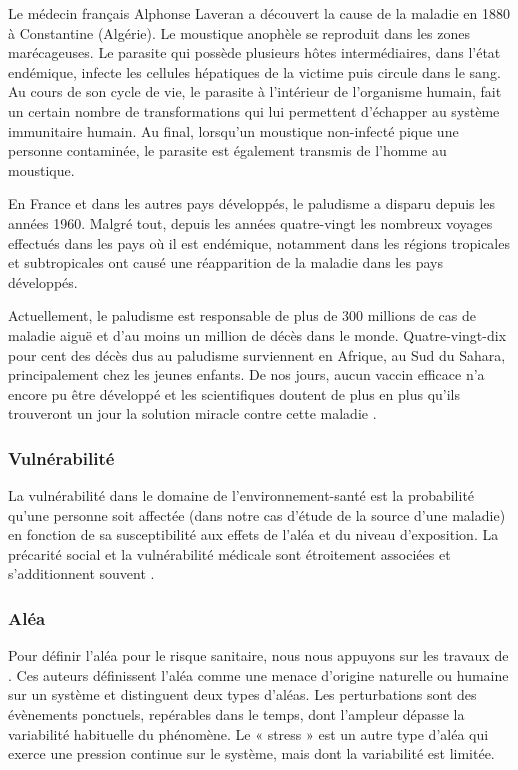 Le médecin français Alphonse Laveran a découvert la cause de la maladie en 1880 à Constantine (Algérie). Le moustique anophèle se reproduit dans les zones marécageuses. Le parasite qui possède plusieurs hôtes intermédiaires, dans l'état endémique, infecte les cellules hépatiques de la victime puis circule dans le sang. Au cours de son cycle de vie, le parasite à l'intérieur de l'organisme humain, fait un certain nombre de transformations qui lui permettent d'échapper au système immunitaire humain. Au final, lorsqu'un moustique non-infecté pique une personne contaminée, le parasite est également transmis de l'homme au moustique.

En France et dans les autres pays développés, le paludisme a disparu depuis les années 1960. Malgré tout, depuis les années quatre-vingt les nombreux voyages effectués dans les pays où il est endémique, notamment dans les régions tropicales et subtropicales ont causé une réapparition de la maladie dans les pays développés.  

Actuellement, le paludisme est responsable de plus de 300 millions de cas de maladie aiguë et d'au moins un million de décès dans le monde. Quatre-vingt-dix pour cent des décès dus au paludisme surviennent en Afrique, au Sud du Sahara, principalement chez les jeunes enfants. De nos jours, aucun vaccin efficace n'a encore pu être développé et les scientifiques doutent de plus en plus qu'ils trouveront un jour la solution miracle contre cette maladie  \citep{questquelepaludisme}.

\subsubsection{Vulnérabilité}

La vulnérabilité dans le domaine de l'environnement-santé est la probabilité qu'une personne soit affectée (dans notre cas d'étude de la source d'une maladie) en fonction de sa susceptibilité aux effets de l'aléa et du niveau d'exposition. La précarité social et la vulnérabilité médicale sont étroitement associées et s'additionnent souvent \citep{DictionnaireSante}.

\subsubsection{Aléa}

Pour définir l'aléa pour le risque sanitaire, nous nous appuyons sur les travaux de \citep{Aschan2009}. Ces auteurs  définissent l'aléa comme une menace d'origine naturelle ou humaine sur un  système et distinguent deux  types d'aléas. Les perturbations sont des évènements ponctuels, repérables dans le temps, dont l'ampleur dépasse la variabilité habituelle du phénomène. Le « stress » est un autre type d'aléa qui exerce une pression continue sur le système, mais dont la variabilité est limitée.

